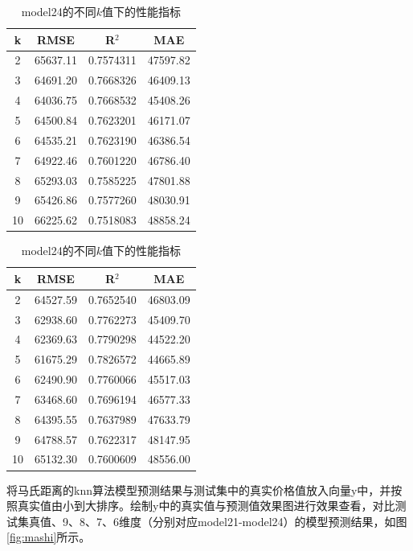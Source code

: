 \documentclass[a4paper,12pt,onecolumn,oneside]{article}
\begin{document}
		\begin{table}
		\begin{subtable}{0.45\textwidth}
			\centering
			\begin{tabular}{cccc}
				\toprule
				k & RMSE & R$^2$ & MAE \\
				\midrule
				2 & 65637.11 & 0.7574311 & 47597.82\\
				3 & 64691.20 & 0.7668326 & 46409.13\\
\rowcolor{gray!25}4 & 64036.75 & 0.7668532 & 45408.26\\
				5 & 64500.84 & 0.7623201 & 46171.07\\
				6 & 64535.21 & 0.7623190 & 46386.54\\
				7 & 64922.46 & 0.7601220 & 46786.40\\
				8 & 65293.03 & 0.7585225 & 47801.88\\
				9 & 65426.86 & 0.7577260 & 48030.91\\
				10 & 66225.62 & 0.7518083 & 48858.24\\
				\bottomrule
			\end{tabular}
			\caption{model23的不同$k$值下的性能指标}
			\label{tbl:model23}
		\end{subtable}
		\hfill
		\begin{subtable}{0.45\textwidth}
			\centering
			\begin{tabular}{cccc}
				\toprule
				k & RMSE & R$^2$ & MAE \\
				\midrule
				2 & 64527.59 & 0.7652540 & 46803.09\\
				3 & 62938.60 & 0.7762273 & 45409.70\\
				4 & 62369.63 & 0.7790298 & 44522.20\\
\rowcolor{gray!25}5 & 61675.29 & 0.7826572 & 44665.89\\
				6 & 62490.90 & 0.7760066 & 45517.03\\
				7 & 63468.60 & 0.7696194 & 46577.33\\
				8 & 64395.55 & 0.7637989 & 47633.79\\
				9 & 64788.57 & 0.7622317 & 48147.95\\
				10 & 65132.30 & 0.7600609 & 48556.00\\
				\bottomrule
			\end{tabular}
			\caption{model24的不同$k$值下的性能指标}
			\label{tbl:model24}
		\end{subtable}
	\end{table}
	将马氏距离的knn算法模型预测结果与测试集中的真实价格值放入向量y中，并按照真实值由小到大排序。绘制y中的真实值与预测值效果图进行效果查看，对比测试集真值、9、8、7、6维度（分别对应model21-model24）的模型预测结果，如图\ref{fig:mashi}所示。
\end{document}
